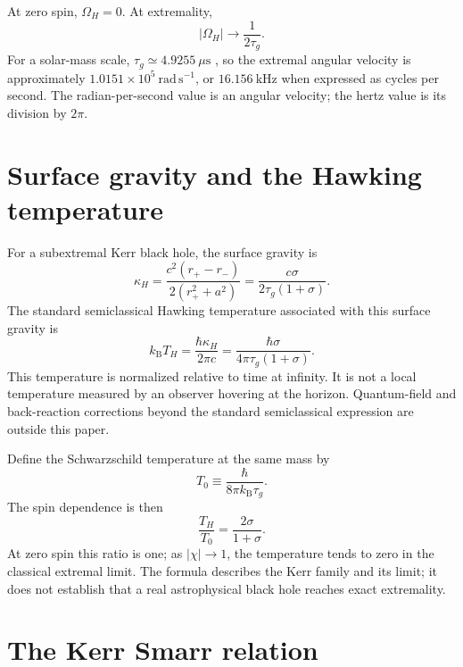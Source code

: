 \documentclass[12pt]{article}
\begin{document}
At zero spin, $\Omega_H=0$. At extremality,
\begin{equation}
  |\Omega_H|\longrightarrow\frac{1}{2\tau_g}.
  \label{eq:extremal-angular-velocity}
\end{equation}
For a solar-mass scale, $\tau_g\simeq4.9255\ \mu\mathrm{s}$ \cite{JPL}, so the extremal angular velocity is approximately $1.0151\times10^5\ \mathrm{rad\,s^{-1}}$, or $16.156\ \mathrm{kHz}$ when expressed as cycles per second. The radian-per-second value is an angular velocity; the hertz value is its division by $2\pi$.

\section{Surface gravity and the Hawking temperature}

For a subextremal Kerr black hole, the surface gravity is \cite{BardeenCarterHawking}
\begin{equation}
  \kappa_H
  =\frac{c^2(r_+-r_-)}{2(r_+^2+a^2)}
  =\frac{c\sigma}{2\tau_g(1+\sigma)}.
  \label{eq:surface-gravity}
\end{equation}
The standard semiclassical Hawking temperature associated with this surface gravity is \cite{Hawking}
\begin{equation}
  k_{\mathrm B}T_H
  =\frac{\hbar\kappa_H}{2\pi c}
  =\frac{\hbar\sigma}{4\pi\tau_g(1+\sigma)}.
  \label{eq:kerr-temperature}
\end{equation}
This temperature is normalized relative to time at infinity. It is not a local temperature measured by an observer hovering at the horizon. Quantum-field and back-reaction corrections beyond the standard semiclassical expression are outside this paper.

Define the Schwarzschild temperature at the same mass by
\begin{equation}
  T_0\equiv\frac{\hbar}{8\pi k_{\mathrm B}\tau_g}.
  \label{eq:schwarzschild-temperature}
\end{equation}
The spin dependence is then
\begin{equation}
  \frac{T_H}{T_0}=\frac{2\sigma}{1+\sigma}.
  \label{eq:temperature-ratio}
\end{equation}
At zero spin this ratio is one; as $|\chi|\to1$, the temperature tends to zero in the classical extremal limit. The formula describes the Kerr family and its limit; it does not establish that a real astrophysical black hole reaches exact extremality.

\section{The Kerr Smarr relation}
\end{document}
